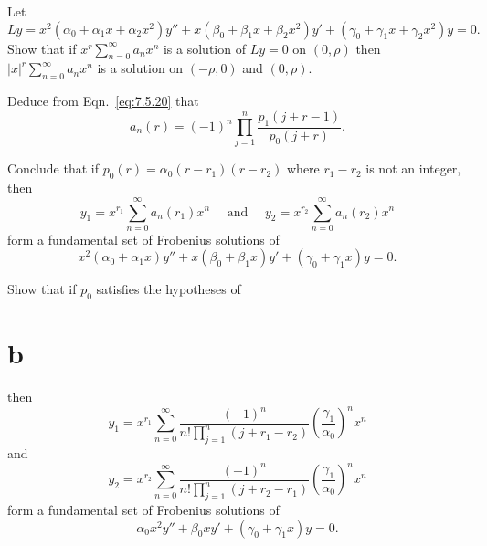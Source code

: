 \begin{exerciselist}
\begin{alist}
    \item %
    Let
    \[
      Ly= x^{2}(\alpha_{0}+\alpha_{1}x+\alpha_{2}x^{2})y''+x(\beta_{0}+\beta_{1}x+\beta_{2}x^{2})y' +(\gamma_{0}+\gamma_{1}x+\gamma_{2}x^{2})y=0.
    \]
    Show that if $x^{r}\sum_{n=0}^{\infty}a_{n}x^{n}$ is a solution of $Ly=0$ on $(0,\rho)$ then
    $|x|^{r}\sum_{n=0}^{\infty}a_{n}x^{n}$ is a solution on $(-\rho,0)$ and $(0,\rho)$.
  \end{alist}

  \item\label{exer:7.5.55}
  \begin{alist}
    \item %
    Deduce from Eqn.~\eqref{eq:7.5.20} that
    \[
      a_{n}(r)=(-1)^{n}\prod_{j=1}^{n}\frac{p_{1}(j+r-1)}{p_{0}(j+r)}.
    \]

    \item %
    Conclude that if $p_{0}(r)=\alpha_{0}(r-r_{1})(r-r_{2})$ where $r_{1}-r_{2}$ is not an integer,
    then
    \[
      y_{1}=x^{r_{1}}\sum_{n=0}^{\infty}a_{n}(r_{1})x^{n}\quad\mbox{ and }\quad y_{2}=x^{r_{2}}\sum_{n=0}^{\infty}a_{n}(r_{2})x^{n}
    \]
    form a fundamental set of Frobenius solutions of
    \[
      x^{2}(\alpha_{0}+\alpha_{1}x)y''+x(\beta_{0}+\beta_{1}x)y'+(\gamma_{0}+\gamma_{1}x)y=0.
    \]

    \item %
    Show that if $p_{0}$ satisfies the hypotheses of \part{b} then
    \[
      y_{1}=x^{r_{1}}\sum_{n=0}^{\infty}\frac{(-1)^{n}}{n!\prod_{j=1}^{n}(j+r_{1}-r_{2})}\left(\frac{\gamma_{1}}{\alpha_{0}}\right)^{n}x^{n}
    \]
    and
    \[
      y_{2}=x^{r_{2}}\sum_{n=0}^{\infty}\frac{(-1)^{n}}{n!\prod_{j=1}^{n}(j+r_{2}-r_{1})}\left(\frac{\gamma_{1}}{\alpha_{0}}\right)^{n}x^{n}
    \]
    form a fundamental set of Frobenius solutions of
    \[
      \alpha_{0}x^{2}y''+\beta_{0}xy'+(\gamma_{0}+\gamma_{1}x)y=0.
    \]
  \end{alist}


\end{exerciselist}
